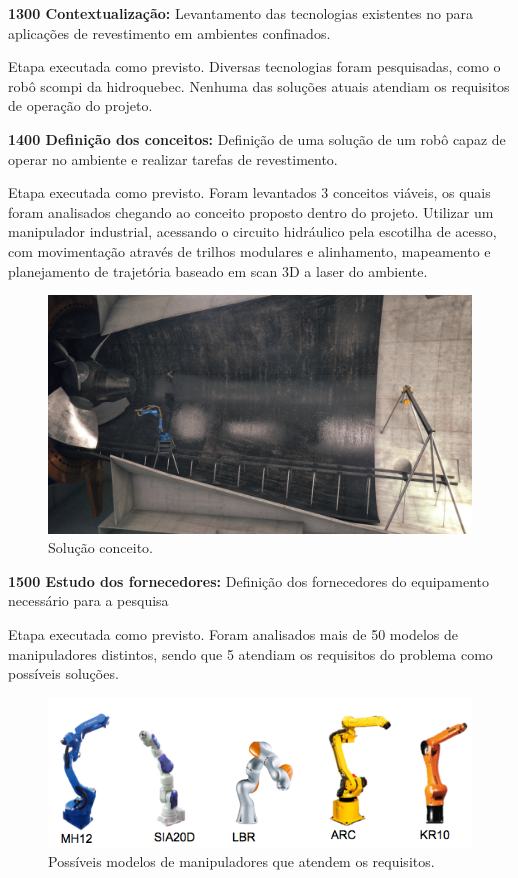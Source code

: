 \textbf{1300 Contextualização:} Levantamento das tecnologias existentes no para
aplicações de revestimento em ambientes confinados.

Etapa executada como previsto. Diversas tecnologias foram pesquisadas, como o
robô scompi da hidroquebec. Nenhuma das soluções atuais atendiam os requisitos
de operação do projeto.

\textbf{1400 Definição dos conceitos:} Definição de uma solução de um robô capaz
de operar no ambiente e realizar tarefas de revestimento.

Etapa executada como previsto. Foram levantados 3 conceitos viáveis, os quais
foram analisados chegando ao conceito proposto dentro do projeto. Utilizar um
manipulador industrial, acessando o circuito hidráulico pela escotilha de
acesso, com movimentação através de trilhos modulares e alinhamento, mapeamento
e planejamento de trajetória baseado em scan 3D a laser do ambiente.

\begin{figure}
\centering
\includegraphics[width=0.9\columnwidth]{figs/turbine_evo}
\caption{Solução conceito.}
\end{figure}

\textbf{1500 Estudo dos fornecedores:} Definição dos fornecedores do equipamento
necessário para a pesquisa

Etapa executada como previsto. Foram analisados mais de 50 modelos de
manipuladores distintos, sendo que 5 atendiam os requisitos do problema como
possíveis soluções.

\begin{figure}
\centering
\includegraphics[width=0.9\columnwidth]{figs/robots}
\caption{Possíveis modelos de manipuladores que atendem os requisitos.}
\end{figure}

